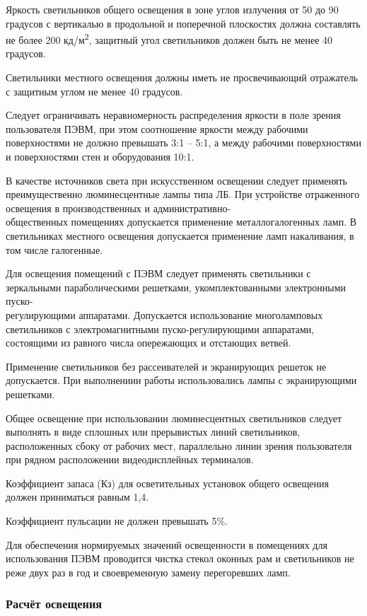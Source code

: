Яркость светильников общего освещения в зоне углов излучения от 50 до 90 градусов с вертикалью в продольной и поперечной плоскостях должна составлять не более 200 кд/м\textsuperscript{2}, защитный угол светильников должен быть не менее 40 градусов.

 Светильники местного освещения должны иметь не просвечивающий отражатель с защитным углом не менее 40 градусов.
 
 Следует ограничивать неравномерность распределения яркости в поле зрения пользователя ПЭВМ, при этом соотношение яркости между рабочими поверхностями не должно превышать 3:1 – 5:1, а между рабочими поверхностями и поверхностями стен и оборудования 10:1.

В качестве источников света при искусственном освещении следует применять преимущественно люминесцентные лампы типа ЛБ. При устройстве отраженного освещения в производственных и административно-\\общественных помещениях допускается применение металлогалогенных ламп. В светильниках местного освещения допускается применение ламп накаливания, в том числе галогенные.

Для освещения помещений с ПЭВМ следует применять светильники с зеркальными параболическими решетками, укомплектованными электронными пуско-\\регулирующими аппаратами. Допускается использование многоламповых светильников с электромагнитными пуско-регулирующими аппаратами, состоящими из равного числа опережающих и отстающих ветвей.

Применение светильников без рассеивателей и экранирующих решеток не допускается. При выполнениии работы использовались лампы с экранирующими решетками.

Общее освещение при использовании люминесцентных светильников следует выполнять в виде сплошных или прерывистых линий светильников, расположенных сбоку от рабочих мест, параллельно линии зрения пользователя при рядном расположении видеодисплейных терминалов. 

Коэффициент запаса (Кз) для осветительных установок общего освещения должен приниматься равным 1,4.

Коэффициент пульсации не должен превышать 5\%.

Для обеспечения нормируемых значений освещенности в помещениях для использования ПЭВМ проводится чистка стекол оконных рам и светильников не реже двух раз в год и своевременную замену перегоревших ламп.

\subsubsection{Расчёт освещения}
